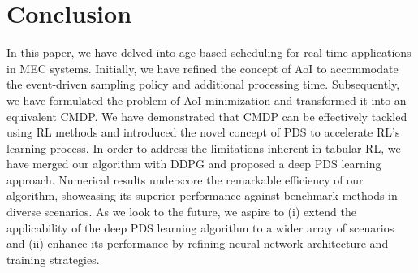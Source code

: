 \documentclass[lettersize, journal]{IEEEtran}
\begin{document}
\section{Conclusion} \label{section:conclusion}
In this paper, we have delved into age-based scheduling for real-time applications in MEC systems. 
Initially, we have refined the concept of AoI to accommodate the event-driven sampling policy and additional processing time. 
Subsequently, we have formulated the problem of AoI minimization and transformed it into an equivalent CMDP. 
We have demonstrated that CMDP can be effectively tackled using RL methods and introduced the novel concept of PDS to accelerate RL's learning process. 
In order to address the limitations inherent in tabular RL, we have merged our algorithm with DDPG and proposed a deep PDS learning approach. 
Numerical results underscore the remarkable efficiency of our algorithm, showcasing its superior performance against benchmark methods in diverse scenarios. 
As we look to the future, we aspire to (i) extend the applicability of the deep PDS learning algorithm to a wider array of scenarios and (ii) enhance its performance by refining neural network architecture and training strategies.




\end{document}
